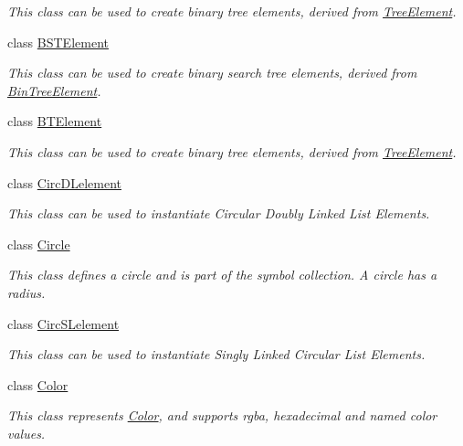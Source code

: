 \begin{DoxyCompactItemize}
\begin{DoxyCompactList}\small\item\em This class can be used to create binary tree elements, derived from \mbox{\hyperlink{classbridges_1_1datastructure_1_1_tree_element}{Tree\+Element}}. \end{DoxyCompactList}\item 
class \mbox{\hyperlink{classbridges_1_1datastructure_1_1_b_s_t_element}{B\+S\+T\+Element}}
\begin{DoxyCompactList}\small\item\em This class can be used to create binary search tree elements, derived from \mbox{\hyperlink{classbridges_1_1datastructure_1_1_bin_tree_element}{Bin\+Tree\+Element}}. \end{DoxyCompactList}\item 
class \mbox{\hyperlink{classbridges_1_1datastructure_1_1_b_t_element}{B\+T\+Element}}
\begin{DoxyCompactList}\small\item\em This class can be used to create binary tree elements, derived from \mbox{\hyperlink{classbridges_1_1datastructure_1_1_tree_element}{Tree\+Element}}. \end{DoxyCompactList}\item 
class \mbox{\hyperlink{classbridges_1_1datastructure_1_1_circ_d_lelement}{Circ\+D\+Lelement}}
\begin{DoxyCompactList}\small\item\em This class can be used to instantiate Circular Doubly Linked List Elements. \end{DoxyCompactList}\item 
class \mbox{\hyperlink{classbridges_1_1datastructure_1_1_circle}{Circle}}
\begin{DoxyCompactList}\small\item\em This class defines a circle and is part of the symbol collection. A circle has a radius. \end{DoxyCompactList}\item 
class \mbox{\hyperlink{classbridges_1_1datastructure_1_1_circ_s_lelement}{Circ\+S\+Lelement}}
\begin{DoxyCompactList}\small\item\em This class can be used to instantiate Singly Linked Circular List Elements. \end{DoxyCompactList}\item 
class \mbox{\hyperlink{classbridges_1_1datastructure_1_1_color}{Color}}
\begin{DoxyCompactList}\small\item\em This class represents \mbox{\hyperlink{classbridges_1_1datastructure_1_1_color}{Color}}, and supports rgba, hexadecimal and named color values. \end{DoxyCompactList}\item 

\end{DoxyCompactItemize}

